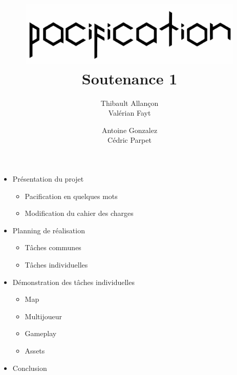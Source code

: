 \documentclass[14pt]{extarticle}
\title{
	{\protect\centering\protect\includegraphics[width=0.8\textwidth]{pacification_vector.pdf}}\\
	{Soutenance 1}\\
}
\author{
	Thibault Allançon\\
	Valérian Fayt
	\and
	Antoine Gonzalez\\
	Cédric Parpet}
\begin{document}
\maketitle
\vspace{1em}

\begin{itemize}
    \item Présentation du projet
    \begin{itemize}
        \item Pacification en quelques mots
        \item Modification du cahier des charges
    \end{itemize}

    \item Planning de réalisation
    \begin{itemize}
        \item Tâches communes
        \item Tâches individuelles
    \end{itemize}

    \item Démonstration des tâches individuelles
    \begin{itemize}
        \item Map
        \item Multijoueur
        \item Gameplay
        \item Assets
    \end{itemize}

    \item Conclusion
\end{itemize}
\end{document}
